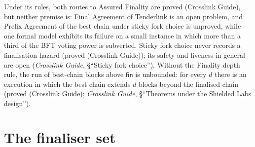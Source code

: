 \documentclass[11pt,a4paper]{article}
\theoremstyle{definition}
\newcommand{\fin}{\mathsf{fin}}
\begin{document}
Under its rules, both routes to Assured Finality are proved (Crosslink
Guide), but neither premise is: Final Agreement of Tenderlink is an open
problem, and Prefix Agreement of the best chain under sticky fork choice is
unproved, while one formal model exhibits its failure on a small instance in
which more than a third of the BFT voting power is subverted. Sticky fork
choice never records a finalisation hazard (proved (Crosslink Guide)); its
safety and liveness in general are open (\emph{Crosslink Guide},
\S``Sticky fork choice''). Without the Finality depth rule,
the run of best-chain blocks above $\fin$ is unbounded: for every $d$ there
is an execution in which the best chain extends $d$ blocks beyond the
finalised chain (proved (Crosslink Guide); \emph{Crosslink Guide},
\S``Theorems under the Shielded Labs design'').

\section{The finaliser set}\label{sec:fs}
\end{document}

